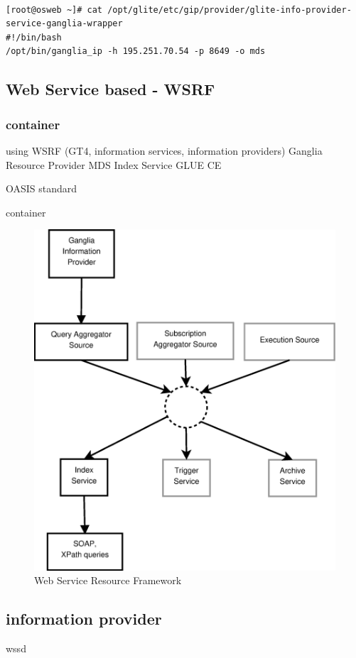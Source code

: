 \begin{lstlisting}

[root@osweb ~]# cat /opt/glite/etc/gip/provider/glite-info-provider-service-ganglia-wrapper
#!/bin/bash
/opt/bin/ganglia_ip -h 195.251.70.54 -p 8649 -o mds
\end{lstlisting}

\newpage

\subsection{Web Service based - WSRF}
\subsubsection{container}
using WSRF (GT4, information services, information providers)
Ganglia Resource Provider
MDS Index Service
GLUE CE 

OASIS standard

container
\begin{figure}[htb]
\centering
 \includegraphics[width=5in]{images/wsrf.eps}
\caption{Web Service Resource Framework}
\label{figure:wsrf}
\end{figure}
\newpage
\subsection{information provider}
wssd

